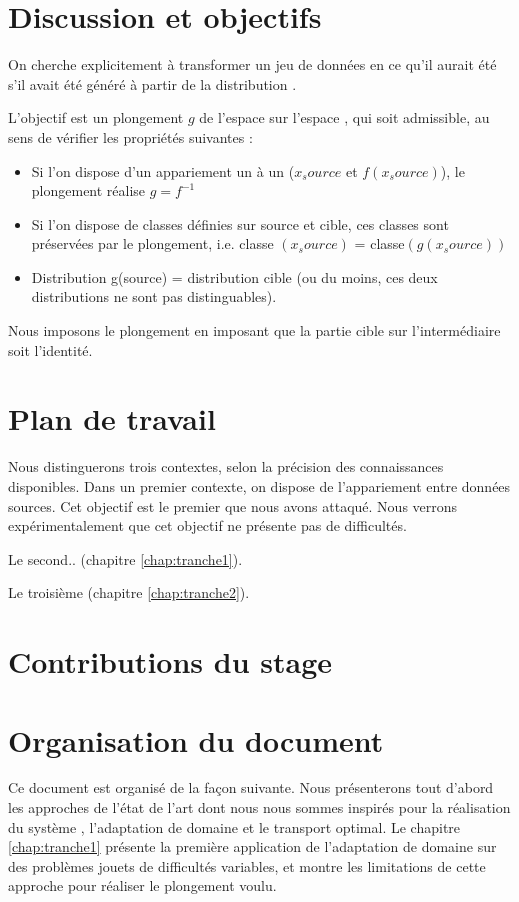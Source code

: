 


\section{Discussion et objectifs}
On cherche explicitement à transformer un jeu de données \source{} en ce qu'il aurait 
été s'il avait été généré à partir de la distribution \cible{}.

L'objectif est un plongement $g$ de l'espace \source{} sur l'espace \cible{}, qui soit admissible, au sens de vérifier les propriétés suivantes : 
\begin{itemize}
\item Si l'on dispose d'un appariement un à un ($x_source$ et $f(x_source)$), le plongement réalise $g = f^{-1}$
\item Si l'on dispose de classes définies sur source et cible, ces classes sont préservées par le plongement, i.e. classe $(x_source)$ = classe$(g(x_source))$
\item Distribution g(source) = distribution cible (ou du moins, ces deux distributions ne sont pas distinguables).
\end{itemize}

Nous imposons le plongement en imposant que la partie cible sur l'intermédiaire soit l'identité. 

\section{Plan de travail}
Nous distinguerons trois contextes, selon la précision des connaissances disponibles. 
Dans un premier contexte, on dispose de l'appariement entre données sources. Cet objectif est le premier que nous avons attaqué. Nous verrons expérimentalement que cet objectif ne présente pas de difficultés.

Le second.. (chapitre \ref{chap:tranche1}).

Le troisième (chapitre \ref{chap:tranche2}).

\section{Contributions du stage}

\section{Organisation du document}

Ce document est organisé de la façon suivante. 
Nous présenterons tout d'abord les approches de l'état de l'art
dont nous nous sommes inspirés pour la réalisation du système \XX{}, l'adaptation de domaine et le transport optimal.
Le chapitre \ref{chap:tranche1} présente la première application de l'adaptation de domaine sur des problèmes jouets de difficultés variables, et montre les limitations de cette approche pour réaliser le plongement voulu. 







